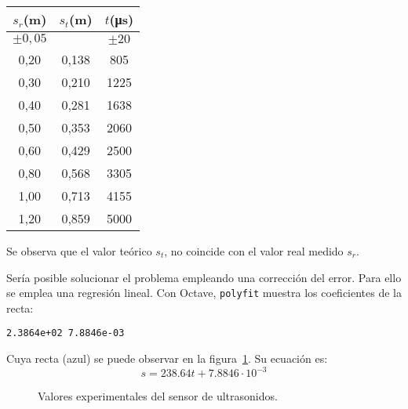 \documentclass[10pt,a4paper,hidelinks,twocolumn]{article}
\begin{document}
\begin{table}[h]
\centering
\begin{tabular}{ | c | c | c | }
\hline
$s_{r}$(m) & $s_{t}$(m) & $t$(\si{\micro\second}) \\ \hline
$\pm 0,05$ &  & $\pm 20$ \\ \hline \hline
0,20 & 0,138 &  805 \\ \hline
0,30 & 0,210 & 1225 \\ \hline
0,40 & 0,281 & 1638 \\ \hline
0,50 & 0,353 & 2060 \\ \hline
0,60 & 0,429 & 2500 \\ \hline
0,80 & 0,568 & 3305 \\ \hline
1,00 & 0,713 & 4155 \\ \hline
1,20 & 0,859 & 5000 \\ \hline
\end{tabular}
\end{table}

Se observa que el valor teórico $s_t$, no coincide con el valor real medido 
$s_r$.

Sería posible solucionar el problema empleando una corrección del error. Para 
ello se emplea una regresión lineal. Con Octave, \texttt{polyfit} muestra los 
coeficientes de la recta:
\begin{center}
\texttt{2.3864e+02   7.8846e-03}
\end{center}
Cuya recta (azul) se puede observar en la figura~\ref{fig:sonar_plot}. Su 
ecuación es:
$$s = 238.64t + 7.8846\cdot10^{-3}$$

\begin{figure}
\caption{Valores experimentales del sensor de ultrasonidos.\label{fig:sonar_plot}}
\end{figure}
\end{document}
